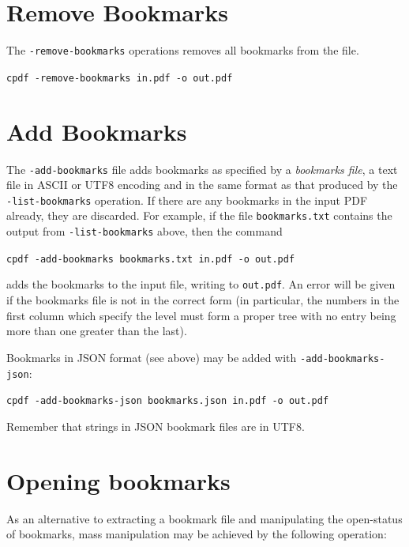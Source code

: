 \documentclass{book}
\begin{document}
  \section{Remove Bookmarks}
  \label{removebookmarks}
  The \texttt{-remove-bookmarks} operations removes all bookmarks from the file.
  \begin{framed}
    \noindent\small\verb!cpdf -remove-bookmarks in.pdf -o out.pdf!
  \end{framed}

  \section{Add Bookmarks}
  
  The \texttt{-add-bookmarks} file adds bookmarks as specified by a
\textit{bookmarks file}, a text file in ASCII or UTF8 encoding and in the same format as that produced by the
\texttt{-list-bookmarks} operation. If there are any bookmarks in the input PDF
already, they are discarded. For example, if the file \texttt{bookmarks.txt}
contains the output from \texttt{-list-bookmarks} above, then the command
  \begin{framed}
   \noindent\small\verb!cpdf -add-bookmarks bookmarks.txt in.pdf -o out.pdf!
  \end{framed}
\noindent adds the bookmarks to the input file, writing to \texttt{out.pdf}. An error
will be given if the bookmarks file is not in the correct form (in particular,
the numbers in the first column which specify the level must form a proper
tree with no entry being more than one greater than the last).

Bookmarks in JSON format (see above) may be added with \texttt{-add-bookmarks-json}:

  \begin{framed}
   \noindent\small\verb!cpdf -add-bookmarks-json bookmarks.json in.pdf -o out.pdf!
  \end{framed}

\noindent Remember that strings in JSON bookmark files are in UTF8.

\section{Opening bookmarks}
As an alternative to extracting a bookmark file and manipulating the open-status of bookmarks, mass manipulation may be achieved by the following operation:
\end{document}
